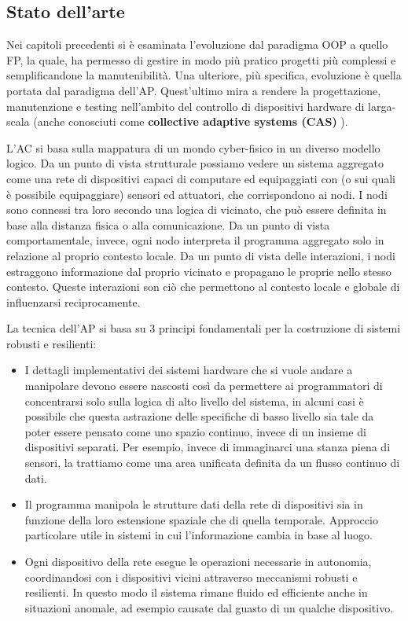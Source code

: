\documentclass[12pt,a4paper,openright,twoside]{book}
\begin{document}
\subsection{Stato dell'arte}

Nei capitoli precedenti si è esaminata l'evoluzione dal paradigma \ac{OOP} a quello \ac{FP}, la quale, ha permesso di gestire in modo più pratico progetti più complessi e semplificandone la manutenibilità. Una ulteriore, più specifica, evoluzione è quella portata dal paradigma dell'\ac{AP}. Quest'ultimo mira a rendere la progettazione, manutenzione e testing nell'ambito del controllo di dispositivi hardware di larga-scala (anche conosciuti come \textbf{collective adaptive systems (CAS)} \cite{Casadei2021}).

L'\ac{AC} si basa sulla mappatura di un mondo cyber-fisico in un diverso modello logico. Da un punto di vista strutturale possiamo vedere un sistema aggregato come una rete di dispositivi capaci di computare ed equipaggiati con (o sui quali è possibile equipaggiare) sensori ed attuatori, che corrispondono ai nodi. I nodi sono connessi tra loro secondo una logica di vicinato, che può essere definita in base alla distanza fisica o alla comunicazione. Da un punto di vista comportamentale, invece, ogni nodo interpreta il programma aggregato solo in relazione al proprio contesto locale. Da un punto di vista delle interazioni, i nodi estraggono informazione dal proprio vicinato e propagano le proprie nello stesso contesto. Queste interazioni son ciò che permettono al contesto locale e globale di influenzarsi reciprocamente.

La tecnica dell'\ac{AP} si basa su 3 principi fondamentali per la costruzione di sistemi robusti e resilienti:

\begin{itemize}
    \item I dettagli implementativi dei sistemi hardware che si vuole andare a manipolare devono essere nascosti così da permettere ai programmatori di concentrarsi solo sulla logica di alto livello del sistema, in alcuni casi è possibile che questa astrazione delle specifiche di basso livello sia tale da poter essere pensato come uno spazio continuo, invece di un insieme di dispositivi separati. Per esempio, invece di immaginarci una stanza piena di sensori, la trattiamo come una area unificata definita da un flusso continuo di dati.
    \item Il programma manipola le strutture dati della rete di dispositivi sia in funzione della loro estensione spaziale che di quella temporale. Approccio particolare utile in sistemi in cui l'informazione cambia in base al luogo.
    \item Ogni dispositivo della rete esegue le operazioni necessarie in autonomia, coordinandosi con i dispositivi vicini attraverso meccanismi robusti e resilienti. In questo modo il sistema rimane fluido ed efficiente anche in situazioni anomale, ad esempio causate dal guasto di un qualche dispositivo.
\end{itemize}
\end{document}
